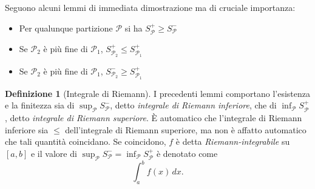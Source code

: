\documentclass[a4paper,twoside]{article}
\theoremstyle{definition}
\newtheorem{definizione}[theorem]{Definizione}
\numberwithin{theorem}{section}
\begin{document}
Seguono alcuni lemmi di immediata dimostrazione ma di cruciale importanza:
\begin{itemize}
 \item Per qualunque partizione $\mathcal{P}$ si ha $S^+_{\mathcal{P}}\geq S^-_{\mathcal{P}}$
 \item Se $\mathcal{P}_2$ è più fine di $\mathcal{P}_1$, $S^+_{\mathcal{P}_2} \leq S^+_{\mathcal{P}_1}$
 \item  Se $\mathcal{P}_2$ è più fine di $\mathcal{P}_1$, $S^-_{\mathcal{P}_2} \geq S^+_{\mathcal{P}_1}$
\end{itemize}

\begin{definizione}[Integrale di Riemann]
I precedenti lemmi comportano l'esistenza e la finitezza sia di $\sup_{\mathcal{P}}S^-_{\mathcal{P}}$, detto \emph{integrale di Riemann inferiore}, che di $\inf_{\mathcal{P}}S^+_{\mathcal{P}}$, detto \emph{integrale di Riemann superiore}. È automatico che l'integrale di Riemann inferiore sia $\leq$ dell'integrale di Riemann superiore, ma non è affatto automatico che tali quantità coincidano. Se coincidono, $f$ è detta \emph{Riemann-integrabile} su $[a,b]$ e il valore di $\sup_{\mathcal{P}}S^-_{\mathcal{P}}=\inf_{\mathcal{P}}S^+_{\mathcal{P}}$ è denotato come 
$$ \int_{a}^{b} f(x)\,dx. $$
\end{definizione}
\end{document}
